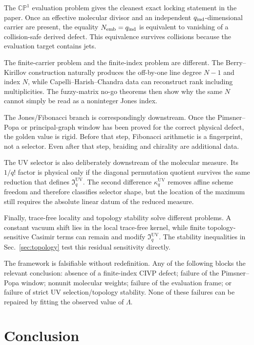 \documentclass[aps,prd,preprint,nofootinbib,superscriptaddress]{revtex4-2}
\theoremstyle{definition}
\theoremstyle{remark}
\newcommand{\UV}{\mathrm{UV}}
\newcommand{\cI}{\mathfrak I}
\newcommand{\CP}{\mathbb{CP}}
\begin{document}
The $\CP^1$ evaluation problem gives the cleanest exact locking statement in
the paper.  Once an effective molecular divisor and an independent
$q_{\rm ind}$-dimensional carrier are present, the equality
$N_{\rm emb}=q_{\rm ind}$ is equivalent to vanishing of a collision-safe
derived defect.  This equivalence survives collisions because the evaluation
target contains jets.

The finite-carrier problem and the finite-index problem are different.  The
Berry--Kirillov construction naturally produces the off-by-one line degree
$N-1$ and index $N$, while Capelli--Harish--Chandra data can reconstruct rank
including multiplicities.  The fuzzy-matrix no-go theorems then show why the
same $N$ cannot simply be read as a noninteger Jones index.

The Jones/Fibonacci branch is correspondingly downstream.  Once the
Pimsner--Popa or principal-graph window has been proved for the correct
physical defect, the golden value is rigid.  Before that step, Fibonacci
arithmetic is a fingerprint, not a selector.  Even after that step, braiding
and chirality are additional data.

The UV selector is also deliberately downstream of the molecular measure.
Its $1/q!$ factor is physical only if the diagonal permutation quotient
survives the same reduction that defines $\cI_q^{\UV}$.  The second
difference $\kappa_q^{\UV}$ removes affine scheme freedom and therefore
classifies selector shape, but the location of the maximum still requires the
absolute linear datum of the reduced measure.

Finally, trace-free locality and topology stability solve different
problems.  A constant vacuum shift lies in the local trace-free kernel, while
finite topology-sensitive Casimir terms can remain and modify
$\cI_q^{\UV}$.  The stability inequalities in Sec.~\ref{sec:topology} test
this residual sensitivity directly.

The framework is falsifiable without redefinition.  Any of the following
blocks the relevant conclusion: absence of a finite-index CIVP defect; failure
of the Pimsner--Popa window; nonunit molecular weights; failure of the
evaluation frame; or failure of strict UV selection/topology stability.  None
of these failures can be repaired by fitting the observed value of
$\Lambda$.

\section{Conclusion}
\label{sec:conclusion}
\end{document}
